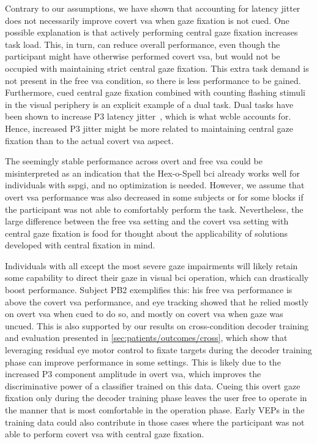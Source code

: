 \documentclass[twocolumn]{article}
\begin{document}
Contrary to our assumptions, we have shown that accounting for latency jitter does not
necessarily improve covert \ac{vsa} when gaze fixation is not cued.
One possible explanation is that actively performing central gaze fixation
increases task load.
This, in turn, can reduce overall performance, even though the participant might
have otherwise performed covert \ac{vsa}, but would not be occupied with
maintaining strict central gaze fixation.
This extra task demand is not present in the free \ac{vsa} condition, so
there is less performance to be gained.
Furthermore, cued central gaze fixation combined with counting flashing stimuli
in the visual periphery is an explicit example of a dual task.
Dual tasks have been shown to increase P3 latency
jitter~\cite{Polich2007,Arico2014, VanDenKerchove2024},
which is what \ac{wcble} accounts for.
Hence, increased P3 jitter might be more related to maintaining central gaze fixation
than to the actual covert \ac{vsa} aspect.

The seemingly stable performance across overt and free \ac{vsa} could be
misinterpreted as an indication that the Hex-o-Spell \ac{bci} already works
well for individuals with \ac{sspgi}, and no optimization is
needed.
However, we assume that overt \ac{vsa} performance was also decreased in some
subjects or for some blocks if the participant was not able to comfortably
perform the task.
Nevertheless, the large difference between the free \ac{vsa} setting and the
covert \ac{vsa} setting
with central gaze fixation is food for thought about the applicability of
solutions developed with central fixation in mind.

Individuals with all except the most severe gaze impairments will likely retain
some capability to direct their gaze in visual \ac{bci} operation, which can
drastically boost performance.
Subject PB2 exemplifies this: his free \ac{vsa} performance is above the covert
\ac{vsa} performance, and eye tracking showed that he relied mostly
on overt \ac{vsa} when cued to do so, and mostly on covert \ac{vsa} when
gaze was uncued.
This is also supported by our results on cross-condition decoder training and evaluation presented
in \cref{sec:patients/outcomes/cross}, which show that leveraging residual
eye motor control to fixate targets during the decoder training phase can improve
performance in some settings.
This is likely due to the increased P3 component amplitude in overt \ac{vsa},
which improves the discriminative power of a classifier trained on this data.
Cueing this overt gaze fixation only during the decoder training phase leaves the user
free to operate in the manner that is most comfortable in the
operation phase.
Early VEPs in the training data could also contribute in those cases where the participant was not
able to perform covert \ac{vsa} with central gaze fixation.
\end{document}

